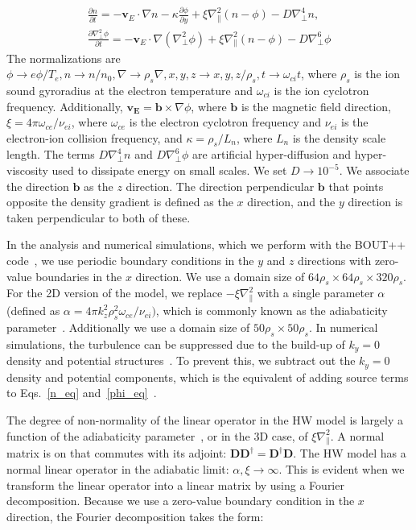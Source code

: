 \documentclass[twocolumn,showkeys,superscriptaddress]{revtex4}
\def\beqar{\begin{eqnarray}}
\def\eeqar{\end{eqnarray}}
\newcommand{\pdiff}[2]{\frac{\partial#1}{\partial#2}}
\def\grad{\nabla}
\newcommand{\gradpar}{\grad_\parallel}
\newcommand{\gradperp}{\grad_\perp}
\begin{document}
\beqar
\label{n_eq}
\pdiff{n}{t} = - {\mathbf v_E} \cdot \grad n - \kappa \pdiff{\phi}{y} + \xi \gradpar^2 (n - \phi) - D \gradperp^4 n, \\
\label{phi_eq}
\pdiff{\gradperp^2 \phi}{t} = - {\mathbf v_E} \cdot \grad (\gradperp^2 \phi) + \xi \gradpar^2 (n - \phi) - D \gradperp^6 \phi
\eeqar
The normalizations are $\phi \to e \phi/T_e, n \to n/n_0, \grad \to \rho_s \grad , x,y,z \to x,y,z/\rho_s, t \to \omega_{ci} t $, where $\rho_s$ is the ion sound gyroradius at the electron temperature and $\omega_{ci}$ is
the ion cyclotron frequency. Additionally, $\mathbf{v_E} = \mathbf{b} \times \grad \phi$, where $\mathbf{b}$ is the magnetic field direction, $\xi = 4 \pi \omega_{ce}/\nu_{ei}$, where $\omega_{ce}$ is the electron cyclotron
frequency and $\nu_{ei}$ is the electron-ion collision frequency,
and $\kappa = \rho_s/L_n$, where $L_n$ is the density scale length. The terms $D \gradperp^4 n$ and $D \gradperp^6 \phi$ are artificial hyper-diffusion and hyper-viscosity used to dissipate
energy on small scales. We set $D \to 10^{-5}$.
We associate the direction $\mathbf{b}$ as the $z$ direction. The direction perpendicular $\mathbf{b}$ that
points opposite the density gradient is defined as the $x$ direction, and the $y$ direction is taken perpendicular to both of these.

In the analysis and numerical simulations, which we perform with the BOUT++ code~\cite{dudson2009}, we use periodic boundary conditions in
the $y$ and $z$ directions with zero-value boundaries in the $x$ direction. We use a domain size of $64 \rho_s \times 64 \rho_s \times 320 \rho_s$.
For the 2D version of the model, we replace $-\xi \gradpar^2$ with a single parameter $\alpha$ (defined as $\alpha = 4 \pi k_z^2 \rho_s^2 \omega_{ce} /\nu_{ei})$, 
which is commonly known as the adiabaticity parameter~\cite{camargo1995,camargo1998}. Additionally we use a domain size of $50 \rho_s \times 50 \rho_s$.
In numerical simulations, the turbulence can be suppressed due to the build-up of $k_y=0$ density and potential structures~\cite{biskamp1995}. To prevent this, we subtract out the $k_y=0$
density and potential components, which is the equivalent of adding source terms to Eqs.~\ref{n_eq} and~\ref{phi_eq}~\cite{friedman2012b}.

The degree of non-normality of the linear operator in the HW model is largely a function of the adiabaticity parameter~\cite{camargo1998}, or in the 3D case, of $\xi \gradpar^2$. 
A normal matrix is on that commutes with its adjoint: $\mathbf{D} \mathbf{D}^\dagger = \mathbf{D}^\dagger \mathbf{D}$.
The HW model has a normal linear operator in the adiabatic limit: $\alpha, \xi \to \infty$. 
This is evident when we transform the linear operator into a linear matrix by using a Fourier decomposition. Because we use a zero-value boundary condition in the $x$ direction, the
Fourier decomposition takes the form:
\end{document}
